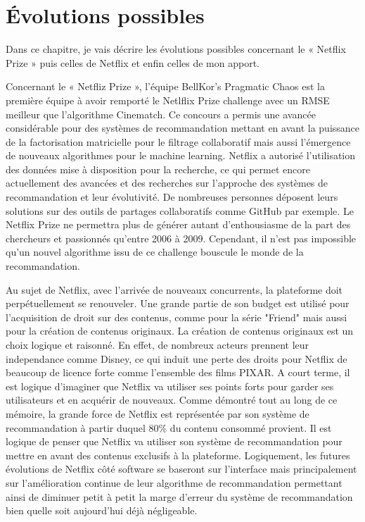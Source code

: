 \chapter{Évolutions possibles}



Dans ce chapitre, je vais décrire les évolutions possibles concernant le  « Netflix Prize »  puis celles de Netflix et enfin celles de mon apport.

\vspace{5mm}

Concernant le « Netfliz Prize », l’équipe BellKor’s Pragmatic Chaos est la première équipe à avoir remporté le Netlflix Prize challenge avec un RMSE meilleur que l’algorithme Cinematch.  Ce concours a permis une avancée considérable pour des systèmes de recommandation mettant en avant la puissance de la factorisation matricielle pour le filtrage collaboratif mais aussi l’émergence de nouveaux algorithmes pour le machine learning. Netflix a autorisé l’utilisation des données mise à disposition pour la recherche, ce qui permet encore actuellement des avancées et des recherches sur l’approche des systèmes de recommandation et leur évolutivité. De nombreuses personnes déposent leurs solutions sur des outils de partages collaboratifs comme GitHub par exemple. Le Netflix Prize ne permettra plus de générer autant d’enthousiasme de la part des chercheurs et passionnés qu’entre 2006 à 2009. Cependant, il n’est pas impossible qu’un nouvel algorithme issu de ce challenge bouscule le monde de la recommandation. 


\vspace{5mm}


Au sujet de Netflix, avec l’arrivée de nouveaux concurrents, la plateforme doit perpétuellement se renouveler. Une grande partie de son budget est utilisé pour l’acquisition de droit sur des contenus, comme pour la série "Friend" mais aussi pour la création de contenus originaux. La création de contenus originaux est un choix logique et raisonné. En effet, de nombreux acteurs prennent leur independance comme Disney, ce qui induit une perte des droits pour Netflix de beaucoup de licence forte comme l’ensemble des films PIXAR. A court terme, il est logique d’imaginer que Netflix va utiliser ses points forts pour garder ses utilisateurs et en acquérir de nouveaux. Comme démontré tout au long de ce mémoire, la grande force de Netflix est représentée par son système de recommandation à partir duquel 80\% du contenu consommé provient. Il est logique de penser que Netflix va utiliser son système de recommandation pour mettre en avant des contenus exclusifs à la plateforme. Logiquement, les futures évolutions de Netflix côté software se baseront sur l’interface mais principalement sur l’amélioration continue de leur algorithme de recommandation permettant ainsi de diminuer petit à petit la marge d’erreur du système de recommandation bien quelle soit aujourd’hui déjà négligeable. 


